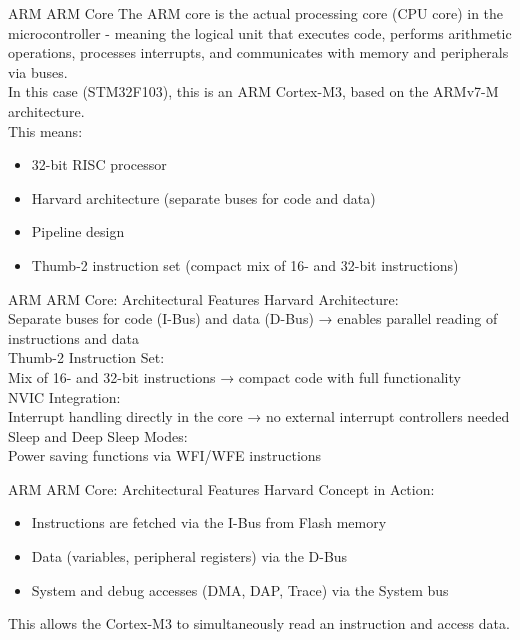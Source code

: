 \documentclass{beamer}
\begin{document}
\begin{frame}{ARM}
	{ARM Core}
	The ARM core is the actual processing core (CPU core) in the microcontroller - meaning the logical unit that executes code, performs arithmetic operations, processes interrupts, and communicates with memory and peripherals via buses.\\
	\vspace{0.2cm}
	In this case (STM32F103), this is an ARM Cortex-M3, based on the ARMv7-M architecture.\\
	This means:
	\begin{itemize}
		\item 32-bit RISC processor
		\item Harvard architecture (separate buses for code and data)
		\item Pipeline design
		\item Thumb-2 instruction set (compact mix of 16- and 32-bit instructions)
	\end{itemize}
\end{frame}
\begin{frame}{ARM}
	{ARM Core: Architectural Features}
	Harvard Architecture:\\
	Separate buses for code (I-Bus) and data (D-Bus) → enables parallel reading of instructions and data\\
	\vspace{0.2cm}
	Thumb-2 Instruction Set:\\
	Mix of 16- and 32-bit instructions → compact code with full functionality\\
	\vspace{0.2cm}
	NVIC Integration:\\
	Interrupt handling directly in the core → no external interrupt controllers needed\\
	\vspace{0.2cm}
	Sleep and Deep Sleep Modes:\\
	Power saving functions via WFI/WFE instructions
\end{frame}
\begin{frame}{ARM}
	{ARM Core: Architectural Features}
	Harvard Concept in Action:
	\begin{itemize}
		\item Instructions are fetched via the I-Bus from Flash memory
		\item Data (variables, peripheral registers) via the D-Bus
		\item System and debug accesses (DMA, DAP, Trace) via the System bus
	\end{itemize}
	This allows the Cortex-M3 to simultaneously read an instruction and access data.
\end{frame}
\end{document}
